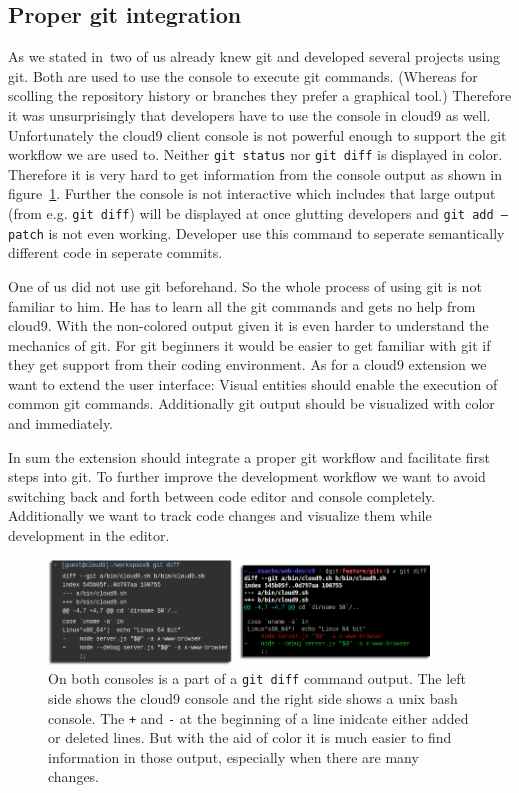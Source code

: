 \subsection{Proper git integration}
\label{subsec:ext_git_integration}
As we stated in~ two of us already knew git and developed several projects using git.
Both are used to use the console to execute git commands.
(Whereas for scolling the repository history or branches they prefer a graphical tool.)
Therefore it was unsurprisingly that developers have to use the console in cloud9 as well.
Unfortunately the cloud9 client console is not powerful enough to support the git workflow we are used to.
Neither \texttt{git status} nor \texttt{git diff} is displayed in color.
Therefore it is very hard to get information from the console output as shown in figure~\ref{fig:diff_output}.
Further the console is not interactive which includes that large output (from e.g. \texttt{git diff}) will be displayed at once glutting developers and \texttt{git add --patch} is not even working.
Developer use this command to seperate semantically different code in seperate commits.

One of us did not use git beforehand.
So the whole process of using git is not familiar to him.
He has to learn all the git commands and gets no help from cloud9.
With the non-colored output given it is even harder to understand the mechanics of git.
For git beginners it would be easier to get familiar with git if they get support from their coding environment.
As for a cloud9 extension we want to extend the user interface: 
Visual entities should enable the execution of common git commands.
Additionally git output should be visualized with color and immediately.

In sum the extension should integrate a proper git workflow and facilitate first steps into git.
To further improve the development workflow we want to avoid switching back and forth between code editor and console completely.
Additionally we want to track code changes and visualize them while development in the editor.

\begin{figure}
   \centering
   \includegraphics[width=0.9\textwidth]{images/diff_output.png}
   \caption{On both consoles is a part of a \texttt{git diff} command output.
   The left side shows the cloud9 console and the right side shows a unix bash console.
   The \texttt{+} and \texttt{-} at the beginning of a line inidcate either added or deleted lines.
   But with the aid of color it is much easier to find information in those output, especially when there are many changes.}
   \label{fig:diff_output}
\end{figure}


